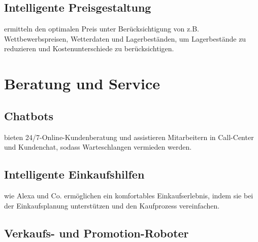 \documentclass[twoside,twocolumn]{article}
\begin{document}
	\subsection{Intelligente Preisgestaltung}
	ermitteln den optimalen Preis unter Berücksichtigung von z.B. Wettbewerbspreisen, Wetterdaten und Lagerbeständen, um Lagerbestände zu reduzieren und Kostenunterschiede zu berücksichtigen.
	\section{Beratung und Service}
	\subsection{Chatbots}
	bieten 24/7-Online-Kundenberatung und assistieren Mitarbeitern in Call-Center und Kundenchat, sodass Warteschlangen vermieden werden.
	\subsection{Intelligente Einkaufshilfen}
	wie Alexa und Co. ermöglichen ein komfortables Einkaufserlebnis, indem sie bei der Einkaufsplanung unterstützen und den Kaufprozess vereinfachen.
	\subsection{Verkaufs- und Promotion-Roboter}

	
	
	
		
		
	
	
\end{document}
